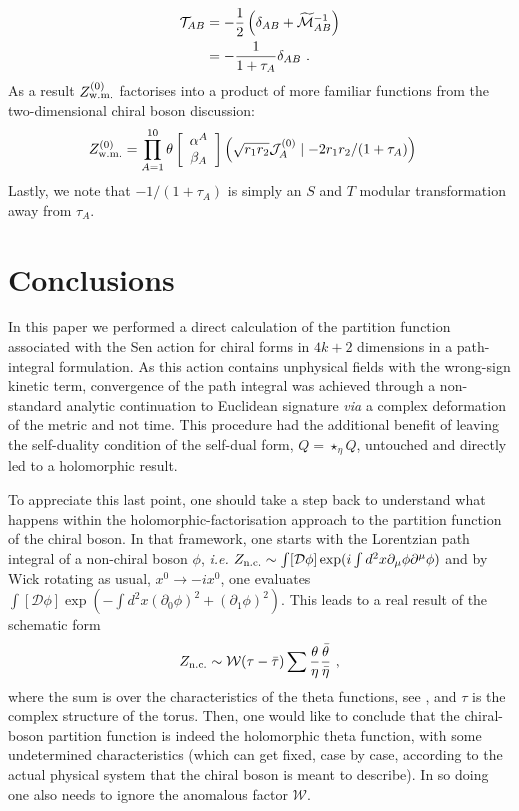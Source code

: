 \documentclass[11pt]{article}
\numberwithin{equation}{section}
\begin{document}
 \begin{align}
     {\cal T}_{AB} &=-\frac12\left(\delta_{AB} +\widetilde {\cal M}^{-1}_{AB}\right)\nonumber\\
     &=- \frac{1}{1+\tau_A}\delta_{AB}\ .
 \end{align}
 As a result $Z^{(0)}_{\rm w.m.}$  factorises into a product  of more familiar functions from the two-dimensional chiral boson discussion:
 \begin{align}
  Z^{(0)}_{\rm w.m.} & = \prod_{A=1}^{10} \theta \left[\begin{array}{c}
\alpha^A \\ \beta_A 	
\end{array}\right]\left(\sqrt{r_1r_2}{\cal J}^{(0)}_A\mid -2r_1r_2/(1+\tau_A)\right)
 \end{align}
Lastly, we note that $-1/(1+\tau_A)$ is simply an $S$ and $T$ modular transformation away from $\tau_A$.


\section{Conclusions}\label{conclusions}

In this paper we performed a direct calculation of the partition function associated with the Sen action for chiral forms in $4k+2$ dimensions in a path-integral formulation. As this action contains unphysical fields with the wrong-sign kinetic term, convergence of the path integral was achieved through a non-standard analytic continuation to Euclidean signature {\it via} a complex deformation of the metric and not time. This procedure had the additional benefit of leaving the self-duality condition of the self-dual form, $Q=\star_\eta Q$, untouched and directly led to a holomorphic result.

To appreciate this last point, one should take a step back to understand what happens within the holomorphic-factorisation approach to the partition function of the chiral boson. In that framework, one  starts with the Lorentzian path integral of a non-chiral boson $\phi$, {\it i.e.} $Z_{\rm n.c.}\sim \int [\mathcal D\phi]\exp(i \int d^2x \partial_{\mu}\phi \partial^{\mu}\phi)$ and by Wick rotating as usual, $x^0\to -ix^0$, one  evaluates $\int [\mathcal D\phi]\exp(- \int d^2x(\partial_0 \phi)^2+(\partial_1 \phi)^2)$. This leads to a real result of the schematic form
\begin{align}
  Z_{\rm n.c.} \sim \mathcal W( \tau-\bar \tau )\sum \frac{\theta}{\eta} \frac{\bar{\theta}}{\bar \eta}\ ,
\end{align}
where the sum is over the characteristics of the theta functions, see \cite{Henningson:1999dm}, and $\tau $ is the complex structure of   the torus. Then, one would like to conclude that the chiral-boson partition function is indeed the holomorphic  theta function, with some undetermined characteristics (which can get fixed, case by case, according to the actual physical system that the chiral boson is meant to describe). In so doing one also needs to ignore the anomalous factor $\mathcal W$.
\end{document}
